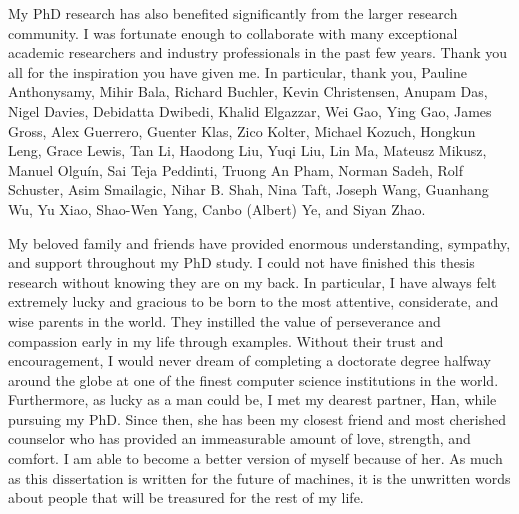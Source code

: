 \begin{acknowledgments}
    My PhD research has also benefited significantly from the larger research
    community. I was fortunate enough to collaborate with many exceptional
    academic researchers and industry professionals in the past few years. Thank
    you all for the inspiration you have given me. In particular, thank you,
    Pauline Anthonysamy, Mihir Bala, Richard Buchler, Kevin Christensen, Anupam
    Das, Nigel Davies, Debidatta Dwibedi, Khalid Elgazzar, Wei Gao, Ying Gao,
    James Gross, Alex Guerrero, Guenter Klas, Zico Kolter, Michael Kozuch,
    Hongkun Leng, Grace Lewis, Tan Li, Haodong Liu, Yuqi Liu, Lin Ma, Mateusz
    Mikusz, Manuel Olguín, Sai Teja Peddinti, Truong An Pham, Norman Sadeh, Rolf
    Schuster, Asim Smailagic, Nihar B. Shah, Nina Taft, Joseph Wang, Guanhang
    Wu, Yu Xiao, Shao-Wen Yang, Canbo (Albert) Ye, and Siyan Zhao.

    My beloved family and friends have provided enormous understanding,
    sympathy, and support throughout my PhD study. I could not have finished
    this thesis research without knowing they are on my back. In particular, I
    have always felt extremely lucky and gracious to be born to the most
    attentive, considerate, and wise parents in the world. They instilled the
    value of perseverance and compassion early in my life through examples.
    Without their trust and encouragement, I would never dream of completing a
    doctorate degree halfway around the globe at one of the finest computer
    science institutions in the world. Furthermore, as lucky as a man could be,
    I met my dearest partner, Han, while pursuing my PhD. Since then, she has
    been my closest friend and most cherished counselor who has provided an
    immeasurable amount of love, strength, and comfort. I am able to become a
    better version of myself because of her. As much as this dissertation is
    written for the future of machines, it is the unwritten words about people
    that will be treasured for the rest of my life.

\end{acknowledgments}

\tableofcontents
\listoffigures
\listoftables
\mainmatter


%
%
%
%
%

